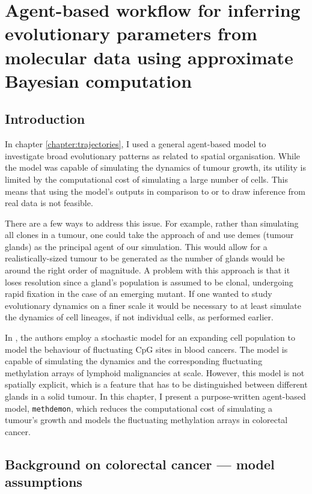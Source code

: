 \chapter{Agent-based workflow for inferring evolutionary parameters from molecular data using approximate Bayesian computation}\label{chapter:methdemon}


\section{Introduction}
In chapter \ref{chapter:trajectories}, I used a general agent-based model to investigate broad evolutionary
patterns as related to spatial organisation. While the model was capable of simulating the dynamics of
tumour growth, its utility is limited by the computational cost of simulating a large number of cells. This means
that using the model's outputs in comparison to or to draw inference from real data is not feasible. \par
There are a few ways to address this issue. For example, rather than simulating all clones in a tumour, one
could take the approach of \cite{sottoriva_big_2015} and use demes (tumour glands) as the principal agent of our
simulation. This would allow for a realistically-sized tumour to be generated as the number of glands would
be around the right order of magnitude. A problem with this approach is that it loses resolution since a
gland's population is assumed to be clonal, undergoing rapid fixation in the case of an emerging mutant. If one wanted to
study evolutionary dynamics on a finer scale it would be necessary to at least simulate the dynamics of cell
lineages, if not individual cells, as performed earlier. \par
In \cite{gabbutt_evolutionary_2023}, the authors employ a stochastic model for an expanding cell population
to model the behaviour of fluctuating CpG sites in blood cancers. The model is capable of simulating the
dynamics and the corresponding fluctuating methylation arrays of lymphoid malignancies at scale. However,
this model is not spatially explicit, which is a feature that has to be distinguished between different
glands in a solid tumour. In this chapter, I present a purpose-written agent-based model, \texttt{methdemon},
which reduces the computational cost of simulating a tumour's growth and models the fluctuating
methylation arrays in colorectal cancer.


\section{Background on colorectal cancer --- model assumptions}

